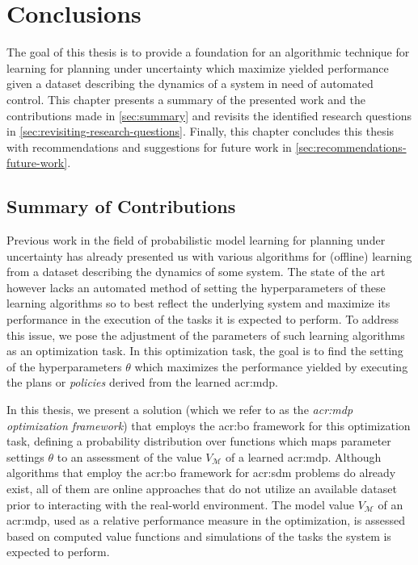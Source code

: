 \chapter{Conclusions}
\label{ch:conclusions}

The goal of this thesis is to provide a foundation for an algorithmic technique for learning  for planning under uncertainty which maximize yielded performance given a dataset describing the dynamics of a system in need of automated control.
This chapter presents a summary of the presented work and the contributions made in \autoref{sec:summary} and revisits the identified research questions in \autoref{sec:revisiting-research-questions}.
Finally, this chapter concludes this thesis with recommendations and suggestions for future work in \autoref{sec:recommendations-future-work}.%


\section{Summary of Contributions}
\label{sec:summary}

Previous work in the field of probabilistic model learning for planning under uncertainty has already presented us with various algorithms for (offline) learning  from a dataset describing the dynamics of some system.
The state of the art however lacks an automated method of setting the hyperparameters of these learning algorithms so to best reflect the underlying system and maximize its performance in the execution of the tasks it is expected to perform.
To address this issue, we pose the adjustment of the parameters of such learning algorithms as an optimization task.
In this optimization task, the goal is to find the setting of the hyperparameters $\theta$ which maximizes the performance yielded by executing the plans or \textit{policies} derived from the learned \acrshort{acr:mdp}.

In this thesis, we present a solution (which we refer to as the \textit{\acrshort{acr:mdp} optimization framework}) that employs the \acrfull{acr:bo} framework for this optimization task, defining a probability distribution over functions which maps parameter settings $\theta$ to an assessment of the value $V_\mathcal{M}$ of a learned \acrshort{acr:mdp}.
Although algorithms that employ the \acrshort{acr:bo} framework for \acrshort{acr:sdm} problems do already exist, all of them are online  approaches that do not utilize an available dataset prior to interacting with the real-world environment.
The model value $V_\mathcal{M}$ of an \acrshort{acr:mdp}, used as a relative performance measure in the optimization, is assessed based on computed value functions and simulations of the tasks the system is expected to perform.

